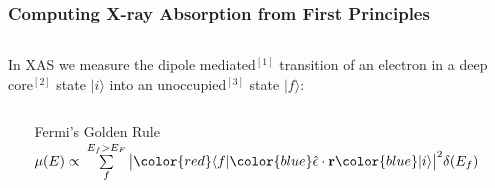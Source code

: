 \newcommand{\GMS}{\mathbb{G}}
\newcommand{\Gnot}{\mathsf{G^0}}
\newcommand{\tmat}{\mathsf{t}}
\newcommand{\boldr}{\boldsymbol{r}}

\begin{frame}
  \frametitle{Computing X-ray Absorption from First Principles}
  \begin{columns}
    \begin{column}{0.75\linewidth}
      In XAS we measure the \alert{dipole mediated}$^\mathrm{[1]}$
      transition of an electron in a \alert{deep core}$^\mathrm{[2]}$
      state {\color{blue}$|i\rangle$} into an
      \alert{unoccupied}$^\mathrm{[3]}$ state
      {\color{red}$|f\rangle$}:

      \begin{columns}
        \begin{column}{0.15\linewidth}
          ~
        \end{column}
        \begin{column}{0.7\linewidth}
          \begin{block}{Fermi's Golden Rule}
            $\mu(E) \propto\> \sum\limits_f^{E_f>E_F}
            \big|{\color{red}\langle f|}
            {\color{blue}\hat{\epsilon}\cdot\mathbf{r}}
            {\color{blue}|i\rangle}\big|^2 \delta(E_f)$
          \end{block}
        \end{column}
        \begin{column}{0.15\linewidth}
          ~
        \end{column}
      \end{columns}

      \medskip


\end{column}
\end{columns}
\end{frame}
